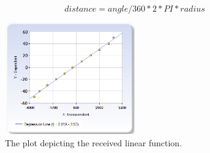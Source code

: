 \documentclass[12pt, a4paper]{article}
\begin{document}
\begin{equation*}
distance = angle / 360 * 2 * PI * radius
\end{equation*}


\begin{figure}
	\centering
	\includegraphics[width=0.5\textwidth]{readings_plot}
	\caption{The plot depicting the received linear function.}
	\label{fig:readings_plot}
\end{figure}


%
%
\end{document}

